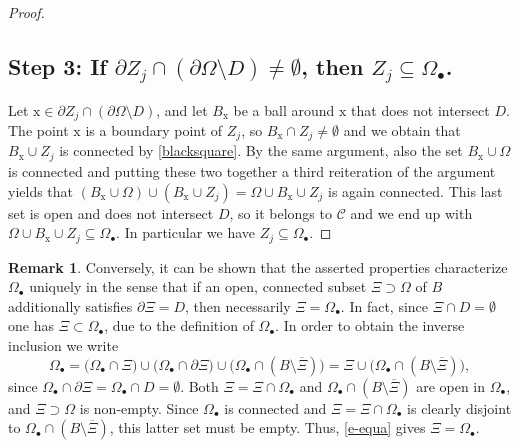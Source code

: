 \documentclass[10pt,leqno]{amsart}
\theoremstyle{definition}
\newtheorem{remark}[theorem]{Remark}
\numberwithin{equation}{section}
\begin{document}
\begin{proof}
\subsection*{Step 3: If $\partial Z_j \cap (\partial \Omega \setminus D) \neq
 \emptyset$, then $Z_j \subseteq \Omega_\bullet$.}
 Let ${{\mathrm x}} \in \partial Z_j \cap (\partial \Omega \setminus D)$, and let
 $B_{{\mathrm x}}$ be a ball around ${{\mathrm x}}$ that does not intersect $D$. The
 point ${{\mathrm x}}$ is a boundary point of $Z_j$, so $B_{{\mathrm x}} \cap Z_j \neq
 \emptyset$ and we obtain that $B_{{\mathrm x}} \cup Z_j$ is connected by
 \eqref{blacksquare}.
 By the same argument, also the set $B_{{\mathrm x}} \cup
 \Omega$ is connected and putting these two together a third reiteration of the
 argument yields that $(B_{{\mathrm x}} \cup \Omega) \cup (B_{{\mathrm x}} \cup Z_j) =
 \Omega \cup B_{{\mathrm x}} \cup Z_j$ is again connected.  This last set is
 open and does not intersect $D$, so it belongs to $\mathcal C$ and we end up
 with $\Omega \cup B_{{\mathrm x}} \cup Z_j \subseteq \Omega_\bullet$. In
 particular we have $Z_j \subseteq \Omega_\bullet$.
\end{proof}

\begin{remark} \label{r-unique}
 Conversely, it can be shown that the asserted properties characterize
 $\Omega_\bullet$ uniquely in the sense that if an open, connected subset $\Xi
 \supset \Omega$ of $B$ additionally satisfies $\partial \Xi = D$, then
 necessarily $\Xi = \Omega_\bullet$. In fact, since $\Xi \cap D = \emptyset$ one
 has $\Xi \subset \Omega_\bullet$, due to the definition of $\Omega_\bullet$. In
 order to obtain the inverse inclusion we write
 \begin{equation} \label{e-equa}
  \Omega_\bullet = \bigl( \Omega_\bullet \cap \Xi \bigr) \cup \bigl(
	\Omega_\bullet \cap \partial \Xi \bigr) \cup \bigl( \Omega_\bullet \cap
	(B \setminus \overline \Xi) \bigr) = \Xi \cup \bigl( \Omega_\bullet
	\cap (B \setminus \overline \Xi) \bigr),
 \end{equation}
 since $\Omega_\bullet \cap \partial \Xi = \Omega_\bullet \cap D = \emptyset$.
 Both $\Xi = \Xi \cap \Omega_\bullet$ and $\Omega_\bullet \cap (B \setminus
 \overline \Xi)$ are open in $\Omega_\bullet$, and $\Xi \supset \Omega$ is
 non-empty. Since $\Omega_\bullet$ is connected and $\Xi = \Xi \cap
 \Omega_\bullet$ is clearly disjoint to $\Omega_\bullet \cap (B \setminus
 \overline \Xi)$, this latter set must be empty. Thus, \eqref{e-equa} gives
 $\Xi =\Omega_\bullet$.
\end{remark}
\end{document}
